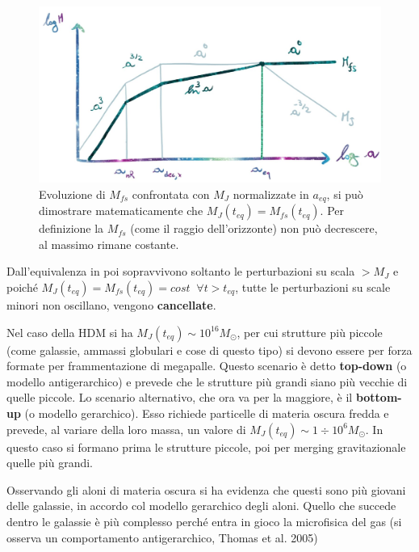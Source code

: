 \begin{figure}[H]
    \centering
    \includegraphics[width=.9 \textwidth]{Pictures/7/mfscold.jpg}
    \caption{Evoluzione di $M_{fs}$ confrontata con $M_J$ normalizzate in $a_{eq}$, si può dimostrare matematicamente che $M_J(t_{eq})=M_{fs}(t_{eq})$. Per definizione la $M_{fs}$ (come il raggio dell'orizzonte) non può decrescere, al massimo rimane costante.}\label{fig:7mfscold}
\end{figure}

\begin{theorem}
 Dall'equivalenza in poi sopravvivono soltanto le perturbazioni su scala $>M_J$ e poiché $M_J(t_{eq})=M_{fs}(t_{eq})=cost\;\; \forall t>t_{eq}$, tutte le perturbazioni su scale minori non oscillano, vengono \textbf{cancellate}.
\end{theorem}

\vspace{1em}
Nel caso della HDM si ha $M_J(t_{eq})\sim 10^{16}M_\odot$, per cui strutture più piccole (come galassie, ammassi globulari e cose di questo tipo) si devono essere per forza formate per frammentazione di megapalle. Questo scenario è detto \textbf{top-down} (o modello antigerarchico) e prevede che le strutture più grandi siano più vecchie di quelle piccole. Lo scenario alternativo, che ora va per la maggiore, è il \textbf{bottom-up} (o modello gerarchico). Esso richiede particelle di materia oscura fredda e prevede, al variare della loro massa, un valore di $M_J(t_{eq})\sim 1\div 10^{6}M_\odot$. In questo caso si formano prima le strutture piccole, poi per merging gravitazionale quelle più grandi. 

Osservando gli aloni di materia oscura si ha evidenza che questi sono più giovani delle galassie, in accordo col modello gerarchico degli aloni. Quello che succede dentro le galassie è più complesso perché entra in gioco la microfisica del gas (si osserva un comportamento antigerarchico, Thomas et al. 2005)

